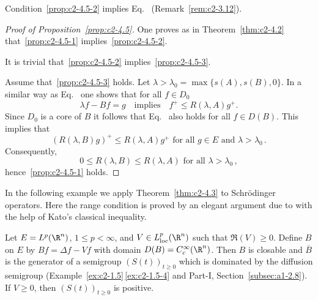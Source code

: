 \begin{remark}\label{rem:c2-4.6}
Condition~\ref{prop:c2-4.5-2}   implies Eq.~ (\cf Remark~\ref{rem:c2-3.12}).
\end{remark}
\begin{proof}[Proof of Proposition~\ref{prop:c2-4.5}]
One proves as in Theorem~\ref{thm:c2-4.2}   that~\ref{prop:c2-4.5-1} implies~\ref{prop:c2-4.5-2}.

It is trivial that~\ref{prop:c2-4.5-2}   implies~\ref{prop:c2-4.5-3}. 

Assume that~\ref{prop:c2-4.5-3}   holds. 
Let $\lambda > \lambda_{0} = \max \{s(A),s(B),0\}$. 
In a similar way as Eq.~ one shows that for all $f \in D_{0}$
\begin{equation}\label{eq:c2-4.10}
\lambda f - Bf = g \quad\text{implies}\quad f^{+} \leq R(\lambda,A)g^{+}.
\end{equation}
Since $D_{0}$ is a core of\/ $B$ it follows that Eq.~ also holds for all $f \in D(B)$. 
This implies that 
\[
(R(\lambda,B)g)^{+} \leq R(\lambda,A)g^{+} \text{ for all } g \in E \text{ and } \lambda > \lambda_{0}\,.
\]
Consequently, 
\[
0 \leq R(\lambda,B) \leq R(\lambda,A) \text{ for all } \lambda > \lambda_{0}\,,
\]
hence~\ref{prop:c2-4.5-1}   holds.
\end{proof}
In the following example we apply Theorem~\ref{thm:c2-4.3} to Schrödinger operators. 
Here the range condition is proved by an elegant argument due to \textcite{kato:1986} with the help of Kato's classical inequality.
\begin{example}
\label{ex:c2-4.7}
Let $E = L^{p}(\R^{n})$, $1 \leq p < \infty$, and $V \in L^{p}_{\text{loc}}(\R^{n})$ such that $\Re(V) \geq 0$.
Define $B$ on $E$ by $Bf = \Delta f - Vf$ with domain $D(B) = C^{\infty}_{c}(\R^{n})$. 
Then $B$ is closable and $\overline{B}$ is the generator of a semigroup $(S(t))_{t \geq 0}$ which is dominated by the diffusion semigroup (Example~\ref{ex:c2-1.5}\,\ref{ex:c2-1.5-4} and Part-I, Section~\ref{subsec:a1-2.8}). 
If\/ $V \geq 0$, then $(S(t))_{t \geq 0}$ is positive.
\end{example}
